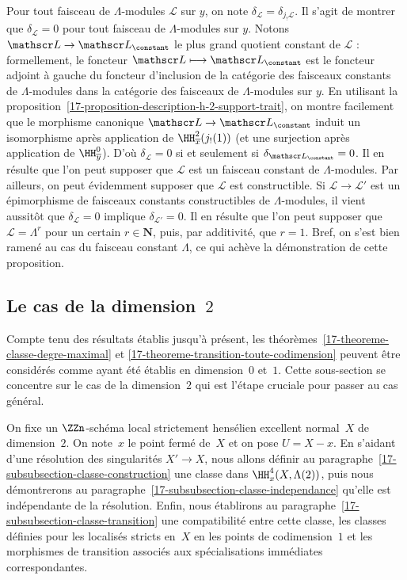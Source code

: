 \documentclass[10pt]{../fichiers-configuration-latex/smfart}
\begin{document}
Pour tout faisceau de $\Lambda$-modules $\mathscr L$ sur $y$, on
note $\delta_{\mathscr L}=\delta_{j_!\mathscr L}$. Il s'agit de montrer que
$\delta_{\mathscr L}=0$ pour tout faisceau de $\Lambda$-modules sur $y$.
Notons $\mathscr L\to {\mathscr L}_{\constant}$ le plus grand
quotient constant de $\mathscr L$ : formellement, le foncteur $\mathscr
L\longmapsto {\mathscr
L}_{\constant}$ est le foncteur adjoint à gauche du foncteur d'inclusion
de la catégorie des faisceaux constants de $\Lambda$-modules dans la
catégorie des faisceaux de $\Lambda$-modules sur $y$.
En utilisant la
proposition~\ref{17-proposition-description-h-2-support-trait}, on montre
facilement que le morphisme canonique ${\mathscr L}\to{\mathscr
L}_{\constant}$ induit un isomorphisme après application de
$\HH^2_{\overline x}(j_!(1))$ (et une surjection après application
de $\HH^0_{\overline y}$). D'où $\delta_{\mathscr
L}=0$ si et seulement si $\delta_{{\mathscr L}_{\constant}}=0$.
Il en résulte que l'on peut supposer que $\mathscr L$ est un faisceau
constant de $\Lambda$-modules. Par ailleurs, on peut évidemment supposer
que $\mathscr L$ est constructible. Si ${\mathscr L}\to{\mathscr L}'$ est
un épimorphisme de faisceaux constants constructibles de $\Lambda$-modules,
il vient aussitôt que $\delta_{\mathscr L}=0$ implique $\delta_{{\mathscr
L}'}=0$. Il en résulte que l'on peut supposer que $\mathscr L=\Lambda^r$
pour un certain $r\in\mathbf{N}$, puis, par additivité, que $r=1$. Bref, on
s'est bien ramené au cas du faisceau constant $\Lambda$, ce qui achève la
démonstration de cette proposition.

\subsection{Le cas de la \texorpdfstring{dimension~$2$}{dimension 2}}%
\label{17-subsection-le-cas-de-la-dimension-2}

Compte tenu des résultats établis jusqu'à présent, les
théorèmes~\ref{17-theoreme-classe-degre-maximal} et
\ref{17-theoreme-transition-toute-codimension} peuvent être considérés comme
ayant été établis en dimension $0$ et $1$. Cette sous-section se concentre
sur le cas de la dimension~$2$ qui est l'étape cruciale pour passer au cas
général.

On fixe un $\ZZn$-schéma local strictement
hensélien excellent normal $X$ de dimension~$2$. On note $x$ le point fermé
de $X$ et on pose $U=X-x$. En s'aidant d'une résolution des singularités
$X'\to X$, nous allons définir au
paragraphe~\ref{17-subsubsection-classe-construction} une classe dans
$\HH^4_x(X,\Lambda(2))$, puis nous démontrerons au
paragraphe~\ref{17-subsubsection-classe-independance} qu'elle est indépendante
de la résolution. Enfin, nous établirons au
paragraphe~\ref{17-subsubsection-classe-transition} une compatibilité entre
cette classe, les classes définies pour les localisés stricts en $X$ en
les points de codimension~$1$ et les morphismes de transition associés aux
spécialisations immédiates correspondantes.
\end{document}
